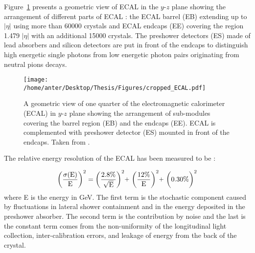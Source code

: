 Figure~\ref{fig:ecal} presents a geometric view of ECAL in the $y$-$z$ plane showing the arrangement of different parts of ECAL 
: the ECAL barrel (EB) extending up to $|\eta|$  using more than 60000 crystals and ECAL endcaps (EE) covering the region 1.479 \ls $|\eta|$  with an additional 15000 crystals. The preshower detectors (ES) made of lead absorbers and silicon detectors are put in front of the endcaps to distinguish high energetic single photons from low energetic photon pairs originating from neutral pions decays.

\begin{figure}[!h]
\begin{center}
\vspace*{3mm} 
\hspace*{-5mm}
\texttt{[image: /home/anter/Desktop/Thesis/Figures/cropped\_ECAL.pdf]}\\
\vspace*{2mm}
\caption[A geometric view of one quarter of the electromagnetic calorimeter (ECAL) in $y$-$z$ plane.]{A geometric view of one quarter of the electromagnetic calorimeter (ECAL) in $y$-$z$ plane showing the arrangement of sub-modules covering the barrel region (EB) and the endcaps (EE). ECAL is complemented with preshower detector (ES) mounted in front of the endcaps. Taken from \cite{Bayatian:2006nff}.}
\label{fig:ecal}
\end{center}
\end{figure}

The relative energy resolution of the ECAL has been measured to be \cite{Adzic:2007mi} :

\begin{equation}
{\rm \bigg(\frac{\sigma(E)}{E}\bigg)^2 = \bigg(\frac{2.8\%}{\sqrt{E}}\bigg)^2 \plus \bigg(\frac{12\%}{E}\bigg)^2 \plus \bigg(0.30\%\bigg)^2}
\end{equation}
where E is the energy in GeV. The first term is the stochastic component caused by fluctuations in lateral shower containment and in the energy deposited in the preshower absorber. The second term is the contribution by noise and the last is the constant term comes from the non-uniformity of the longitudinal light collection, inter-calibration errors, and leakage of energy from the back of the crystal.

